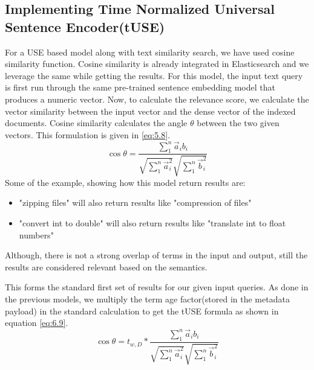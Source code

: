 \subsection{Implementing Time Normalized Universal Sentence Encoder(tUSE)}
For a USE based model along with text similarity search, we have used cosine similarity function. Cosine similarity is already integrated in Elasticsearch and we leverage the same while getting the results. For this model, the input text query is first run through the same pre-trained sentence embedding model that produces a numeric vector. Now, to calculate the relevance score, we calculate the vector similarity between the input vector and the dense vector of the indexed documents. Cosine similarity calculates the angle $\theta$ between the two given vectors. This formulation is given in \ref{eq:5.8}.
\begin{equation} \label{eq:5.8}
    \cos \theta = \frac{\sum_{1}^{n} \vec a_{i}b_{i}}{\sqrt{\sum_{1}^{n} \vec a_{i}^2}\sqrt{\sum_{1}^{n} \vec b_{i}^2}}
\end{equation}
Some of the example, showing how this model return results are:
\begin{itemize}
    \item "zipping files" will also return results like "compression of files"
    \item "convert int to double" will also return results like "translate int to float numbers"
\end{itemize}
Although, there is not a strong overlap of terms in the input and output, still the results are considered relevant based on the semantics.

This forms the standard first set of results for our given input queries. As done in the previous models, we multiply the term age factor(stored in the metadata payload) in the standard calculation to get the tUSE formula as shown in equation \ref{eq:6.9}.
\begin{equation} \label{eq:6.9}
    \cos \theta = t_{w,D}*\frac{\sum_{1}^{n} \vec a_{i}b_{i}}{\sqrt{\sum_{1}^{n} \vec a_{i}^2}\sqrt{\sum_{1}^{n} \vec b_{i}^2}}
\end{equation}


